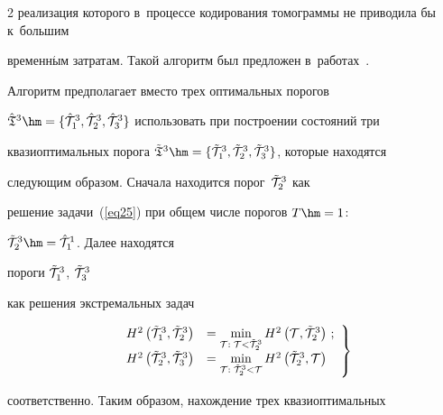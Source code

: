 \begin{multicols}{2}
реализация которого в~процессе кодирования томограммы не приводила бы к~большим 

временн$\acute{\mbox{ы}}$м затратам. Такой алгоритм был предложен в~работах~\cite{b03,b04}.



Алгоритм предполагает вместо трех оптимальных порогов 

 $\hat{\frak T}^3\hm=\{{\hat{\cal T}}^{3}_{1}, {\hat{\cal T}}^{3}_{2}, 

 {\hat{\cal T}}^{3}_{3}\}$ использовать при построении состояний три 

 квазиоптимальных порога $\tilde{\frak T}^3\hm=\{{\tilde{\cal T}}^{3}_{1}, 

 {\tilde{\cal T}}^{3}_{2}, {\tilde{\cal T}}^{3}_{3}\}$, которые находятся 

 следующим образом. Сначала находится порог~${\tilde{\cal T}}^{3}_{2}$ как 

 решение задачи~(\ref{eq25}) при общем числе порогов $T\hm=1$:  

 ${\tilde{\cal T}}^{3}_{2}\hm={\hat{\cal T}}^{1}_{1}$. Далее находятся 

 пороги ${\tilde{\cal T}}^{3}_{1}$, ${\tilde{\cal T}}^{3}_{3}$  

 как решения экстремальных задач

 \begin{equation}

\left.

\begin{array}{rl}

H^{2}\left({\tilde{\cal T}}^{3}_{1},{\tilde{\cal T}}^{3}_{2}\right) &=

\min\limits_{{\cal T}:\;{\cal T} < \tilde{\cal T}^{3}_{2}}  

H^2\left({\cal T},\tilde{\cal T}^{3}_{2}\right)\,;

\\

H^{2}\left({\tilde{\cal T}}^{3}_{2},{\tilde{\cal T}}^{3}_{3}\right) &=

\min\limits_{{\cal T}:\;\tilde{\cal T}^{3}_{2} < 

{\cal T}}  H^2\left(\tilde{\cal T}^{3}_{2},{\cal T}\right)

\end{array}

\right\}

\label{eq26}

\end{equation}

соответственно. Таким образом, нахождение трех квазиоптимальных 


\end{multicols}
